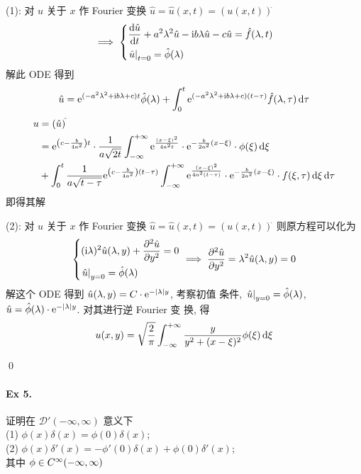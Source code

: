 \solution
(1): 对 $u$ 关于 $x$ 作 Fourier 变换 $\hat u = \hat u(x, t) = (u(x, t))^{\hat{}}$
\[\implies {\left\{ \begin{aligned} 
&{\frac{\operatorname{d\!}{\hat u}}{\operatorname{d\!}{t}}} +a^2\lambda^2\hat u -{\mathrm i}b\lambda\hat u -c\hat u
 =\hat f(\lambda, t) \\
&{\left.{\hat u} \right|}_{t=0} = \hat\phi(\lambda)
 \end{aligned} \right.}
\]
解此 ODE 得到
\[
\hat u = {\mathrm e}^{(-a^2\lambda^2 + {\mathrm i} b \lambda + c)t} \hat\phi(\lambda)
+ \int_0^t {\mathrm e}^{(-a^2\lambda^2 + {\mathrm i} b \lambda + c)(t - \tau)}
 \hat f(\lambda, \tau) \operatorname{d\!} \tau
\]
\[ \begin{aligned}
u &= (\hat u)^{\check{}} \\
&= {\mathrm e}^{{\left( {c-\frac{b}{4a^2}} \right)}t} \cdot \frac{1}{a\sqrt{2t}}
\int_{-\infty}^{+\infty} {\mathrm e}^{\frac{(x - \xi)^2}{4a^2t}} \cdot
{\mathrm e}^{-\frac{b}{2a^2}(x-\xi)} \cdot \phi(\xi) \operatorname{d\!} \xi \\
&+ \int_0^{t} \frac{1}{a\sqrt{t-\tau}} {\mathrm e}^{{\left( {c-\frac{b}{4a^2}} \right)}(t-\tau)}
\int_{-\infty}^{+\infty} {\mathrm e}^{\frac{(x - \xi)^2}{4a^2(t-\tau)}} \cdot
{\mathrm e}^{-\frac{b}{2a^2}(x-\xi)} \cdot f(\xi, \tau) \operatorname{d\!} \xi \operatorname{d\!} \tau
\end{aligned} \]
即得其解

\noindent (2): 对 $u$ 关于 $x$ 作 Fourier 变换
$\hat u = \hat u(x, t) = (u(x, t))^{\hat{}}$ 则原方程可以化为
\[ {\left\{ \begin{aligned} 
& ({\mathrm i}\lambda)^2 \hat u(\lambda, y)	+ {\frac{\partial {^2\hat u}}{\partial {y^2}}} = 0 \\
& {\left.{\hat u} \right|}_{y=0} = \hat \phi(\lambda)
 \end{aligned} \right.} \implies {\frac{\partial {^2\hat u}}{\partial {y^2}}} = \lambda^2\hat u(\lambda, y) = 0\]
解这个 ODE 得到 $\hat u(\lambda, y) = C \cdot {\mathrm e}^{-{\lvert {\lambda} \rvert} y}$, 考察初值
条件, ${\left.{\hat u} \right|}_{y=0} = \hat\phi(\lambda)$,
$\hat u = \hat\phi(\lambda) \cdot {\mathrm e}^{-{\lvert {\lambda} \rvert}y}$. 对其进行逆 Fourier 变
换, 得
\[
u(x, y) = \sqrt{\frac{2}{\pi}} \int_{-\infty}^{+\infty} \frac{y}{y^2+(x-\xi)^2}
\phi(\xi) \operatorname{d\!} \xi
\]

\qed

\paragraph{Ex 5.}
证明在 $\mathcal D'(-\infty, \infty)$ 意义下 \\
(1) $\phi(x)\delta(x) = \phi(0)\delta(x)$; \\
(2) $\phi(x)\delta'(x) = -\phi'(0)\delta(x) + \phi(0)\delta'(x)$; \\
其中 $\phi \in C{^\infty(-\infty, \infty)}$

